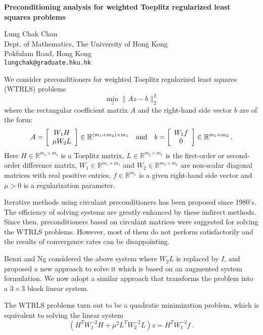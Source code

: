 \documentclass{report}
\newcommand{\Reals}{\mathbb{R}}
\begin{document}

\begin{center}
{\large
{\bf Preconditioning analysis for weighted
Toeplitz regularized least squares problems}}

	Lung Chak Chan \\
	Dept. of Mathematics, The University of Hong Kong \\
	Pokfulam Road, Hong Kong \\
	{\tt lungchak@graduate.hku.hk}
\end{center}

We consider
preconditioners for weighted
Toeplitz regularized least squares (WTRLS) problems
$$
\min_z \| A z - b \|_2^2
$$
where the rectangular coefficient matrix $A$ and the
right-hand side vector $b$ are of the form:
$$ 
A =
\left [
\begin{array}{c}
W_1 H \\
\mu W_2 L \\
\end{array}
\right ] \in \Reals^{(m_{1}+m_{2}) \times m_{1}}
\quad {\rm and}\quad  b =
\left [
\begin{array}{c}
W_1 f \\
 0 \\
\end{array}
\right ] \in \Reals^{m_{1}+m_{2}} \,.
$$
Here $H \in \Reals^{m_{1} \times m_{1}}$ is a Toeplitz matrix, $L
\in \Reals^{m_{2} \times m_{1}}$ is the first-order or second-order
difference matrix, $W_1 \in \Reals^{m_{1} \times m_{1}}$ and $W_2
\in \Reals^{m_{2} \times m_{2}}$ are non-scalar diagonal matrices
with real positive entries, $f \in \Reals^{m_{1}}$ is a given
right-hand side vector and $\mu >0$ is a regularization parameter.


Iterative methods using circulant preconditioners has been proposed 
since 1980's. 
The efficiency of solving systems are
greatly enhanced by these indirect methods.  Since then,
preconditioners based on circulant matrices were suggested for
solving the WTRLS problems.  However, most of them do not perform
satisfactorily and the results of convergence rates can be disappointing.


Benzi and Ng 
considered the above system
where $W_{2}L$ is replaced by $I$, and proposed a new approach to
solve it which is based on an augmented system formulation. We now
adopt a similar approach that transforms the problem into a
$3 \times 3$ block linear system.

The WTRLS problems turn out to be a quadratic minimization problem, which is equivalent to solving the linear system
$$ %
(H^{T}W_{1}^{-2}H + \mu^{2} L^{T}W_{2}^{-2}L)z = H^{T} W_{1}^{-2} f~.
$$
\end{document}
